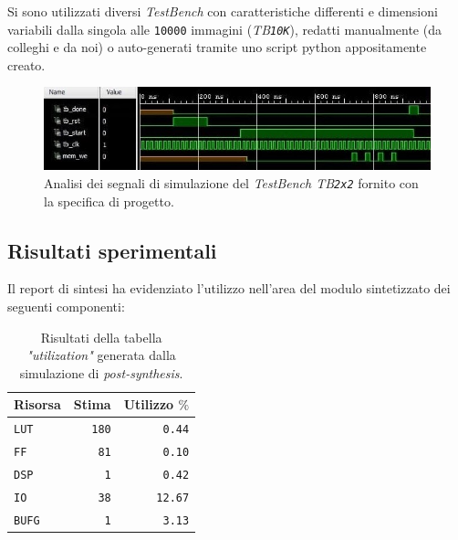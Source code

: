 \documentclass{article}
\begin{document}
Si sono utilizzati diversi \emph{TestBench} con caratteristiche differenti e dimensioni variabili dalla singola alle \texttt{10000} immagini (\emph{TB\texttt{10K}}), redatti manualmente (da colleghi e da noi) o auto-generati tramite uno script python appositamente creato.
\vspace{0,2cm}

\begin{figure}[ht]
    \centering
    \includegraphics[scale=0.8]{2x2.jpg}
    \caption{Analisi dei segnali di simulazione del \emph{TestBench TB\texttt{2x2}} fornito con la specifica di progetto.}
\end{figure}
\vspace{0,2cm}

\pagebreak

\subsection{Risultati sperimentali}
Il report di sintesi ha evidenziato l’utilizzo nell’area del modulo sintetizzato dei seguenti componenti:

\begin{table}[ht]
    \centering
    \small
    \def\arraystretch{1.3} %
    \caption{Risultati della tabella \emph{"utilization"} generata dalla simulazione di \emph{post-synthesis}.}
    \begin{tabular}[width=4cm]{|| l | r | r ||}
        \hline
        Risorsa       & Stima        & Utilizzo $\%$\footnotemark \\
        \hline \hline
        \texttt{LUT}  & \texttt{180} & \texttt{0.44}              \\ \hline
        \texttt{FF}   & \texttt{81}  & \texttt{0.10}              \\ \hline
        \texttt{DSP}  & \texttt{1}   & \texttt{0.42}              \\ \hline
        \texttt{IO}   & \texttt{38}  & \texttt{12.67}             \\ \hline
        \texttt{BUFG} & \texttt{1}   & \texttt{3.13}              \\ \hline
    \end{tabular}
\end{table}
\vspace{0,2cm}
\end{document}

